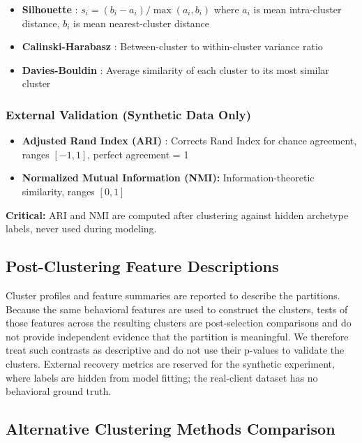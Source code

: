 \documentclass[11pt,a4paper]{article}
\begin{document}
\begin{itemize}
    \item \textbf{Silhouette} \cite{rousseeuw1987silhouettes}: $s_i = (b_i - a_i) / \max(a_i, b_i)$ where $a_i$ is mean intra-cluster distance, $b_i$ is mean nearest-cluster distance
    \item \textbf{Calinski-Harabasz} \cite{calinski1974dendrite}: Between-cluster to within-cluster variance ratio
    \item \textbf{Davies-Bouldin} \cite{davies1979cluster}: Average similarity of each cluster to its most similar cluster
\end{itemize}

\subsubsection{External Validation (Synthetic Data Only)}

\begin{itemize}
    \item \textbf{Adjusted Rand Index (ARI)} \cite{gates2019adjusted}: Corrects Rand Index for chance agreement, ranges $[-1, 1]$, perfect agreement = 1
    \item \textbf{Normalized Mutual Information (NMI):} Information-theoretic similarity, ranges $[0, 1]$
\end{itemize}

\textbf{Critical:} ARI and NMI are computed after clustering against hidden archetype labels, never used during modeling.

\subsection{Post-Clustering Feature Descriptions}
\label{sec:statistical_tests}

Cluster profiles and feature summaries are reported to describe the partitions. Because the same behavioral features are used to construct the clusters, tests of those features across the resulting clusters are post-selection comparisons and do not provide independent evidence that the partition is meaningful. We therefore treat such contrasts as descriptive and do not use their p-values to validate the clusters. External recovery metrics are reserved for the synthetic experiment, where labels are hidden from model fitting; the real-client dataset has no behavioral ground truth.

\subsection{Alternative Clustering Methods Comparison}
\label{sec:alternative_clustering}
\end{document}
